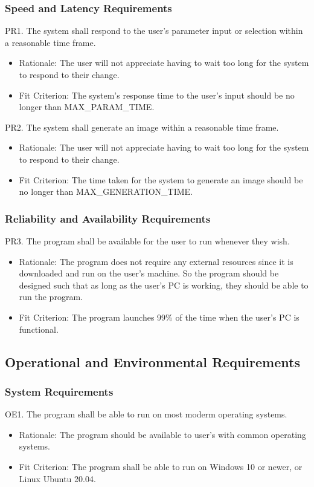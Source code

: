 \documentclass[12pt, titlepage]{article}
\begin{document}
\subsubsection{Speed and Latency Requirements}
PR1. The system shall respond to the user's parameter input or selection within a reasonable time frame.
\begin{itemize}
    \item Rationale: The user will not appreciate having to wait too long for the system to respond to their change.
    \item \color{red} Fit Criterion: The system's response time to the user's input should be no longer than MAX\_PARAM\_TIME. \color{black}
\end{itemize}
PR2. The system shall generate an image within a reasonable time frame.
\begin{itemize}
    \item Rationale: The user will not appreciate having to wait too long for the system to respond to their change.
    \item \color{red} Fit Criterion: The time taken for the system to generate an image should be no longer than MAX\_GENERATION\_TIME. \color{black}
\end{itemize}
\subsubsection{Reliability and Availability Requirements}
PR3. The program shall be available for the user to run whenever they wish.
\begin{itemize}
    \item Rationale: The program does not require any external resources since it is downloaded and run on the user's machine. So the program should be designed such that as long as the user's PC is working, they should be able to run the program.
    \item \color{red} Fit Criterion: The program launches 99\% of the time when the user's PC is functional. \color{black}
\end{itemize}

\subsection{Operational and Environmental Requirements}
\subsubsection{System Requirements}
OE1. The program shall be able to run on most moderm operating systems.
\begin{itemize}
    \item Rationale: The program should be available to user's with common operating systems.
    \item \color{red} Fit Criterion: The program shall be able to run on Windows 10 or newer, or Linux Ubuntu 20.04. \color{black}
\end{itemize}
\end{document}
